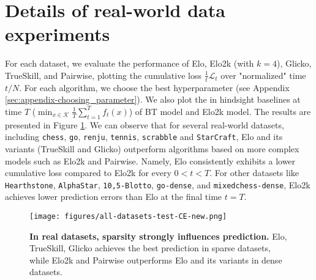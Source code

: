 \section{Details of real-world data experiments}
\label{sec:appendix-realdata}
For each dataset, we evaluate the performance of Elo, Elo2k (with $k=4$), Glicko, TrueSkill, and Pairwise, plotting the cumulative loss $\frac{1}{t} \mathcal{L}_t$ over "normalized" time $t/N$. For each algorithm, we choose the best hyperparameter (see Appendix \ref{sec:appendix-choosing_parameter}). We also plot the in hindsight baselines at time $T$ ($\min_{x \in \mathcal{K}}\frac1T \sum_{t=1}^{T}f_t(x)$) of BT model and Elo2k model.  The results are presented in Figure \ref{fig:realdata-CE}. We can observe that for several real-world datasets, including \texttt{chess}, \texttt{go}, \texttt{renju}, \texttt{tennis}, \texttt{scrabble} and \texttt{StarCraft},
Elo and its variants (TrueSkill and Glicko) outperform algorithms based on more complex models such as Elo2k and Pairwise. Namely, Elo consistently exhibits a lower cumulative loss compared to Elo2k for every $0<t<T$. For other datasets like \texttt{Hearthstone}, \texttt{AlphaStar}, \texttt{10,5-Blotto}, \texttt{go-dense}, and \texttt{mixedchess-dense}, Elo2k achieves lower prediction errors than Elo at the final time $t=T$.
\begin{figure}[t]

    \centering
    \texttt{[image: figures/all-datasets-test-CE-new.png]}
    
    \caption{\textbf{In real datasets, sparsity strongly influences prediction.} Elo, TrueSkill, Glicko achieves the best prediction in sparse datasets, while Elo2k and Pairwise outperforms Elo and its variants in dense datasets.}
    \label{fig:realdata-CE}
\end{figure}


